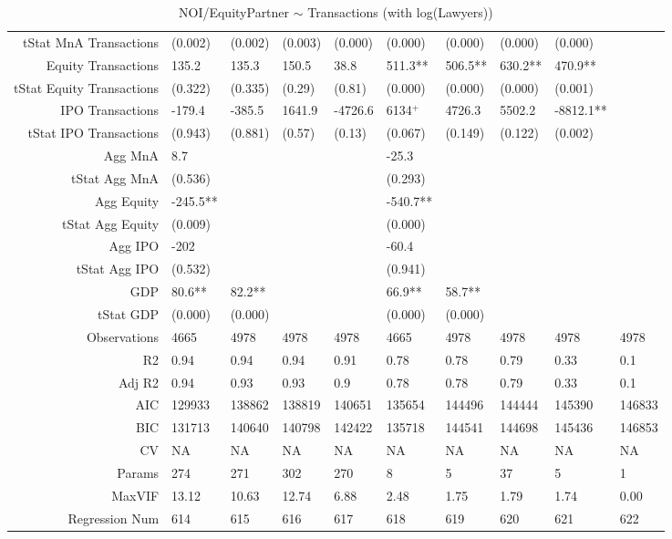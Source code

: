 \begin{table}[ht]
\begin{tabular}{rlllllllll}
  tStat MnA Transactions & (0.002) & (0.002) & (0.003) & (0.000) & (0.000) & (0.000) & (0.000) & (0.000) &  \\ 
  Equity Transactions & 135.2 & 135.3 & 150.5 & 38.8 & 511.3** & 506.5** & 630.2** & 470.9** &  \\ 
  tStat Equity Transactions & (0.322) & (0.335) & (0.29) & (0.81) & (0.000) & (0.000) & (0.000) & (0.001) &  \\ 
  IPO Transactions & -179.4 & -385.5 & 1641.9 & -4726.6 & 6134$^{+}$ & 4726.3 & 5502.2 & -8812.1** &  \\ 
  tStat IPO Transactions & (0.943) & (0.881) & (0.57) & (0.13) & (0.067) & (0.149) & (0.122) & (0.002) &  \\ 
  Agg MnA & 8.7 &  &  &  & -25.3 &  &  &  &  \\ 
  tStat Agg MnA & (0.536) &  &  &  & (0.293) &  &  &  &  \\ 
  Agg Equity & -245.5** &  &  &  & -540.7** &  &  &  &  \\ 
  tStat Agg Equity & (0.009) &  &  &  & (0.000) &  &  &  &  \\ 
  Agg IPO & -202 &  &  &  & -60.4 &  &  &  &  \\ 
  tStat Agg IPO & (0.532) &  &  &  & (0.941) &  &  &  &  \\ 
  GDP & 80.6** & 82.2** &  &  & 66.9** & 58.7** &  &  &  \\ 
  tStat GDP & (0.000) & (0.000) &  &  & (0.000) & (0.000) &  &  &  \\ 
  Observations & 4665 & 4978 & 4978 & 4978 & 4665 & 4978 & 4978 & 4978 & 4978 \\ 
  R2 & 0.94 & 0.94 & 0.94 & 0.91 & 0.78 & 0.78 & 0.79 & 0.33 & 0.1 \\ 
  Adj R2 & 0.94 & 0.93 & 0.93 & 0.9 & 0.78 & 0.78 & 0.79 & 0.33 & 0.1 \\ 
  AIC & 129933 & 138862 & 138819 & 140651 & 135654 & 144496 & 144444 & 145390 & 146833 \\ 
  BIC & 131713 & 140640 & 140798 & 142422 & 135718 & 144541 & 144698 & 145436 & 146853 \\ 
  CV & NA & NA & NA & NA & NA & NA & NA & NA & NA \\ 
  Params & 274 & 271 & 302 & 270 & 8 & 5 & 37 & 5 & 1 \\ 
  MaxVIF & 13.12 & 10.63 & 12.74 & 6.88 & 2.48 & 1.75 & 1.79 & 1.74 & 0.00 \\ 
  Regression Num & 614 & 615 & 616 & 617 & 618 & 619 & 620 & 621 & 622 \\ 
   \hline
\end{tabular}
\caption{NOI/EquityPartner $\sim$ Transactions (with log(Lawyers))} 
\end{table}
